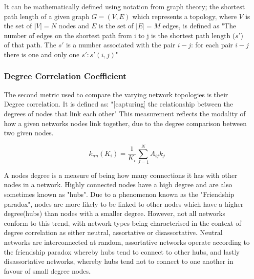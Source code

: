It can be mathematically defined using notation from graph theory; the shortest path length of a given graph $G = (V,E)$ which represents a topology, where $V$ is the set of $|V|=N$ nodes and $E$ is the set of $|E|=M$ edges, is defined as "The number of edges on the shortest path from i to j is the shortest path length ($s'$) of that path. The $s'$ is a number associated with the pair $i-j$: for each pair $i-j$ there is one and only one $s':s'(i,j)$"\cite{santos2022shortestpathpathlength} \cite{DSPL_second_source}

\subsubsection{Degree Correlation Coefficient}
The second metric used to compare the varying network topologies is their Degree correlation. It is defined as:
"[capturing] the relationship between the degrees of nodes that link each other" \cite{barabasi2016network} This measurement reflects the modality of how a given networks nodes link together, due to the degree comparison between two given nodes. 

\begin{equation}
    k_{nn}(K_i) = \frac{1}{K_i}\sum^{N}_{J=1}A_{ij}k_j
\end{equation}

A nodes degree is a measure of being how many connections it has with other nodes in a network. Highly connected nodes have a high degree and are also sometimes known as "hubs". Due to a phenomenon known as the "Friendship paradox", nodes are more likely to be linked to other nodes which have a higher degree(hubs) than nodes with a smaller degree. However, not all networks conform to this trend, with network types being characterised in the context of degree correlation as either neutral, assortative or disassortative. Neutral networks are interconnected at random, assortative networks operate according to the friendship paradox whereby hubs tend to connect to other hubs, and lastly disassortative networks, whereby hubs tend not to connect to one another in favour of small degree nodes. 

